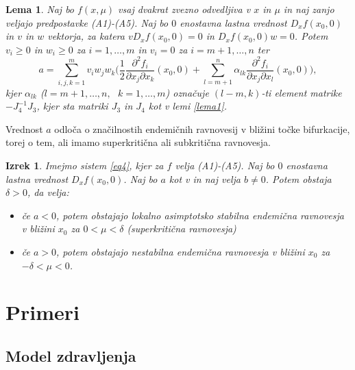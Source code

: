 \documentclass[a4paper,12pt]{article}
\newcommand{\todo}[1]{{\color{red}{#1}}}
\newtheorem{lema}{Lema}
\newtheorem{izrek}{Izrek}
\begin{document}
\begin{lema}\label{lema2}
    Naj bo \(f(x,\mu)\) vsaj dvakrat zvezno odvedljiva v 
    \(x\) in \(\mu\) in naj zanjo veljajo predpostavke (A1)-(A5).
    Naj bo \(0\) enostavna lastna vrednost \(D_xf(x_0,0)\) in \(v\) in \(w\)
    vektorja, za katera \(vD_xf(x_0,0)=0\) in \(D_xf(x_0,0)w=0\). 
    Potem \(v_i\geq 0\) in \(w_i\geq 0\) za \(i=1,\ldots, m\) in 
    \(v_i=0\) za \(i=m+1,\ldots,n\) ter 
    \[a=\sum_{i,j,k=1}^m v_i w_j w_k \big(\frac{1}{2}\frac{\partial^2 f_i}{\partial x_j \partial x_k}(x_0,0)+\sum_{l=m+1}^n \alpha_{lk}\frac{\partial^2 f_i}{\partial x_j \partial x_l}(x_0,0)\big),\]
    kjer \(\alpha_{lk}\) (\(l=m+1,\ldots,n,\textrm{ }k=1,\ldots,m\)) označuje 
    \((l-m,k)\)-ti element matrike \(-J_4^{-1}J_3\), kjer sta matriki \(J_3\) in \(J_4\)
    kot v lemi \ref{lema1}.
\end{lema}

\todo{dokaz:izpusti}

Vrednost \(a\) odloča o značilnostih endemičnih ravnovesij v bližini točke bifurkacije, 
torej o tem, ali imamo superkritična ali subkritična ravnovesja. 

\begin{izrek}\label{izrek2}
    Imejmo sistem \ref{eq4}, kjer za \(f\) velja (A1)-(A5). Naj bo \(0\) enostavna
    lastna vrednost \(D_xf(x_0,0)\). Naj bo \(a\) kot v \label{eq5} in naj velja \(b\neq 0\).
    Potem obstaja \(\delta >0\), da velja:
    \begin{itemize}
        \item če \(a<0\), potem obstajajo lokalno asimptotsko stabilna endemična ravnovesja
        v bližini \(x_0\) za \(0<\mu <\delta\) (superkritična ravnovesja)
        \item če \(a>0\), potem obstajajo nestabilna endemična ravnovesja v bližini \(x_0\) 
        za \(-\delta < \mu < 0\).
    \end{itemize}
\end{izrek}

\todo{dokaz}

\section{Primeri}
\subsection{Model zdravljenja}
\end{document}
